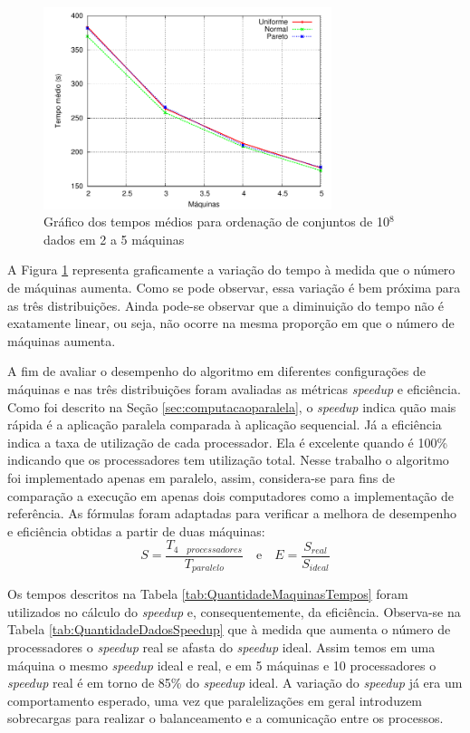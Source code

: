 \begin{figure}[!htb]
\centering
\includegraphics[width=0.75\textwidth]{figuras/MaquinasTempo.pdf}
\caption{Gráfico dos tempos médios para ordenação de conjuntos de 10$^8$ dados em 2 a 5 máquinas}
\label{fig:MaquinasTempos}
\end{figure}

A Figura \ref{fig:MaquinasTempos} representa graficamente a variação do tempo à medida que o número de máquinas aumenta. Como se pode observar, essa variação é bem próxima para as três distribuições. Ainda pode-se observar que a diminuição do tempo não é exatamente linear, ou seja, não ocorre na mesma proporção em que o número de máquinas aumenta. 



A fim de avaliar o desempenho do algoritmo em diferentes configurações de máquinas e nas três distribuições foram avaliadas as métricas \textit{speedup} e eficiência. 
Como foi descrito na Seção \ref{sec:computacaoparalela}, o \textit{speedup} indica quão mais rápida é a aplicação paralela comparada à aplicação sequencial. Já a eficiência  indica a taxa de utilização de cada processador. Ela é  excelente quando é 100\% indicando que os processadores tem utilização total.
Nesse trabalho o algoritmo foi implementado apenas em paralelo, assim, considera-se para fins de comparação a execução em apenas dois computadores como a implementação de referência. As fórmulas foram adaptadas para verificar a melhora de desempenho e eficiência obtidas a partir de duas máquinas: 
\[ S = \frac{T_{4 \quad processadores}}{T_{paralelo}}  
\quad\mbox{e}\quad
 E = \frac{S_{real}}{S_{ideal}}\]

Os tempos descritos na Tabela \ref{tab:QuantidadeMaquinasTempos} foram utilizados no cálculo do 
\textit{speedup} e, consequentemente, da eficiência.
Observa-se na Tabela \ref{tab:QuantidadeDadosSpeedup} que à medida que aumenta o número de processadores o \textit{speedup} real se afasta do \textit{speedup} ideal. Assim temos em uma máquina o mesmo \textit{speedup} ideal e real, e em 5 máquinas e 10 processadores o \textit{speedup} real é em torno de 85\% do \textit{speedup} ideal. A variação do \textit{speedup} já era um comportamento esperado, uma vez que paralelizações em geral introduzem sobrecargas para realizar o balanceamento e a comunicação entre os processos.


